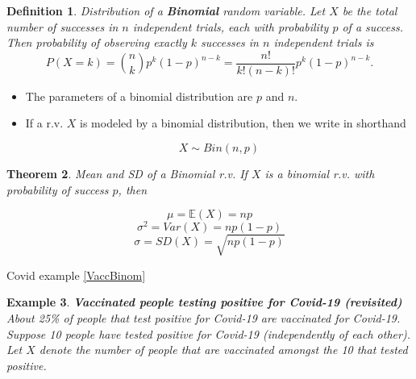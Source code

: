 \documentclass[12pt]{amsart}
\newtheorem{theorem}{Theorem}[section]
\newtheorem{definition}[theorem]{Definition}
\newtheorem{example}[theorem]{Example}
\begin{document}
{\begin{definition}{Distribution of a \textbf{Binomial} random variable.} \newline
Let $X$ be the total number of successes in $n$ independent trials, each with probability $p$ of a success. \newline
Then probability of observing exactly $k$ successes in $n$ independent trials is 
\color{blue}
$$
P(X = k) = {n\choose k}p^k(1-p)^{n-k} = \frac{n!}{k!(n-k)!}p^k(1-p)^{n-k}.
\label{binomialFormula}
$$
\color{black}
\vspace{1cm}
\end{definition}


\begin{itemize}
\item The parameters of a binomial distribution are $p$ and $n$. 
\item If a r.v. $X$ is modeled by a binomial distribution, then we write in shorthand

\color{blue}
$$X\sim Bin(n,p)$$
\color{black}
\end{itemize}



\newpage
\begin{theorem}{Mean and SD of a Binomial r.v.} \newline
If $X$ is a binomial r.v. with probability of success $p$, then 

\color{blue}
$$\mu = \mathbb{E}(X) = np$$
$$\sigma^2= Var(X) = np(1-p)$$
$$\sigma = SD(X) =  \sqrt{np(1-p)}$$
\color{black}
\vspace{1cm}


\end{theorem}


\color{blue}
Covid example \ref{VaccBinom}
\color{black}



\newpage
\begin{example}\label{VaccBinom10}  \textbf{Vaccinated people testing positive for Covid-19 (revisited)} \newline
About 25\% of people that test positive for Covid-19 are vaccinated for Covid-19.\newline
Suppose 10 people have tested positive for Covid-19 (independently of each other). \newline
Let $X$ denote the number of people that are vaccinated amongst the 10 that tested positive.


\end{example}}
\end{document}
